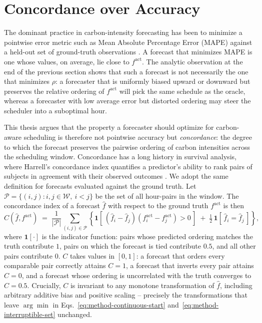 \section{Concordance over Accuracy}
\label{sec:method-concordance}
The dominant practice in carbon-intensity forecasting has been to minimize a pointwise error metric such as Mean Absolute Percentage Error (MAPE) against a held-out set of ground-truth observations \cite{maji_carboncast_2022, yan_ensembleci_2025, zhang_gnn-based_2023}.
A forecast that minimizes MAPE is one whose values, on average, lie close to $f^{\text{act}}$.
The analytic observation at the end of the previous section shows that such a forecast is not necessarily the one that minimizes $\rho$: a forecaster that is uniformly biased upward or downward but preserves the relative ordering of $f^{\text{act}}$ will pick the same schedule as the oracle, whereas a forecaster with low average error but distorted ordering may steer the scheduler into a suboptimal hour.

This thesis argues that the property a forecaster should optimize for carbon-aware scheduling is therefore not pointwise accuracy but \textit{concordance}: the degree to which the forecast preserves the pairwise ordering of carbon intensities across the scheduling window.
Concordance has a long history in survival analysis, where Harrell's concordance index quantifies a predictor's ability to rank pairs of subjects in agreement with their observed outcomes \cite{harrell_concordance_1996}.
We adopt the same definition for forecasts evaluated against the ground truth.
Let $\mathcal{P} = \{(i,j) : i, j \in \mathcal{W},\ i < j\}$ be the set of all hour-pairs in the window.
The concordance index of a forecast $\hat{f}$ with respect to the ground truth $f^{\text{act}}$ is then
\begin{equation}
    C(\hat{f}, f^{\text{act}}) \;=\; \frac{1}{|\mathcal{P}|} \sum_{(i,j) \in \mathcal{P}} \left\{ \mathbf{1}\!\left[\,(\hat{f}_i - \hat{f}_j)(f^{\text{act}}_i - f^{\text{act}}_j) > 0\,\right] \;+\; \tfrac{1}{2}\, \mathbf{1}\!\left[\,\hat{f}_i = \hat{f}_j\,\right] \right\},
    \label{eq:method-concordance}
\end{equation}
where $\mathbf{1}[\cdot]$ is the indicator function: pairs whose predicted ordering matches the truth contribute $1$, pairs on which the forecast is tied contribute $0.5$, and all other pairs contribute $0$.
$C$ takes values in $[0, 1]$: a forecast that orders every comparable pair correctly attains $C = 1$, a forecast that inverts every pair attains $C = 0$, and a forecast whose ordering is uncorrelated with the truth converges to $C = 0.5$.
Crucially, $C$ is invariant to any monotone transformation of $\hat{f}$, including arbitrary additive bias and positive scaling -- precisely the transformations that leave $\arg\min$ in Eqs.~\ref{eq:method-continuous-start} and~\ref{eq:method-interruptible-set} unchanged.

